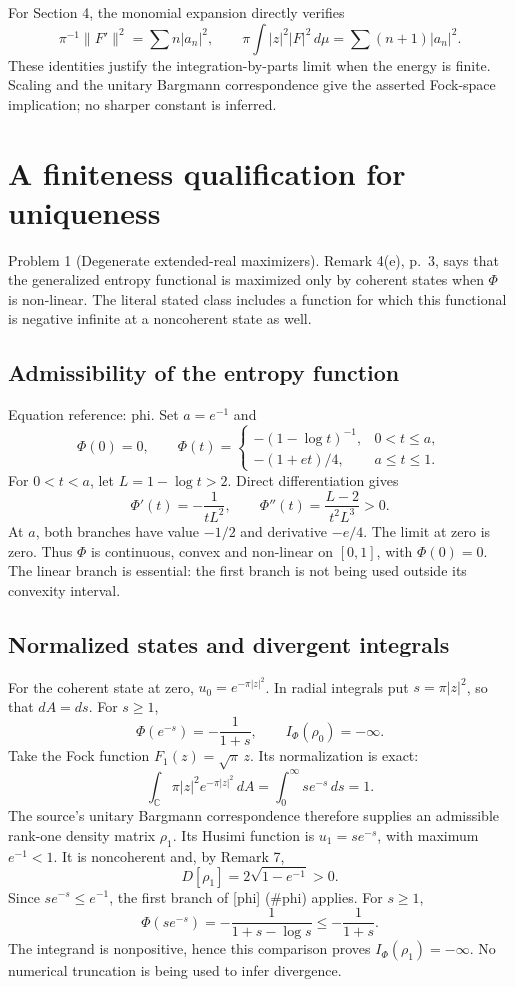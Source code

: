 \documentclass[10pt]{article}
\begin{document}
For Section 4, the monomial expansion directly verifies \[\pi^{-1}\|F'\|^2=\sum n|a_n|^2,\qquad
 \pi\int|z|^2|F|^2\,d\mu=\sum(n+1)|a_n|^2 .\] These identities justify the integration-by-parts limit when the energy is finite. Scaling and the unitary Bargmann correspondence give the asserted Fock-space implication; no sharper constant is inferred.\par
\section*{A finiteness qualification for uniqueness}
Problem 1 (Degenerate extended-real maximizers).  Remark 4(e), p. 3, says that the generalized entropy functional is maximized only by coherent states when \(\Phi\) is non-linear. The literal stated class includes a function for which this functional is negative infinite at a noncoherent state as well.\par
\subsection*{Admissibility of the entropy function}
Equation reference: phi. Set \(a=e^{-1}\) and \[
 \Phi(0)=0,\qquad
 \Phi(t)=\begin{cases}
 -(1-\log t)^{-1},&0<t\leq a,\\
 -(1+et)/4,&a\leq t\leq1 .
 \end{cases}\] For \(0<t<a\), let \(L=1-\log t>2\). Direct differentiation gives \[\Phi'(t)=-\frac1{tL^2},\qquad
 \Phi''(t)=\frac{L-2}{t^2L^3}>0.\] At \(a\), both branches have value \(-1/2\) and derivative \(-e/4\). The limit at zero is zero. Thus \(\Phi\) is continuous, convex and non-linear on \([0,1]\), with \(\Phi(0)=0\). The linear branch is essential: the first branch is not being used outside its convexity interval.\par
\subsection*{Normalized states and divergent integrals}
For the coherent state at zero, \(u_0=e^{-\pi|z|^2}\). In radial integrals put \(s=\pi|z|^2\), so that \(dA=ds\). For \(s\geq1\), \[\Phi(e^{-s})=-\frac1{1+s},\qquad I_\Phi(\rho_0)=-\infty.\] Take the Fock function \(F_1(z)=\sqrt{\pi}\,z\). Its normalization is exact: \[\int_{\mathbb C}\pi|z|^2e^{-\pi|z|^2}\,dA
 =\int_0^\infty se^{-s}\,ds=1.\] The source’s unitary Bargmann correspondence therefore supplies an admissible rank-one density matrix \(\rho_1\). Its Husimi function is \(u_1=se^{-s}\), with maximum \(e^{-1}<1\). It is noncoherent and, by Remark 7, \[D[\rho_1]=2\sqrt{1-e^{-1}}>0.\] Since \(se^{-s}\leq e^{-1}\), the first branch of [phi] (\#phi) applies. For \(s\geq1\), \[\Phi(se^{-s})=-\frac1{1+s-\log s}\leq-\frac1{1+s}.\] The integrand is nonpositive, hence this comparison proves \(I_\Phi(\rho_1)=-\infty\). No numerical truncation is being used to infer divergence.\par
\end{document}
